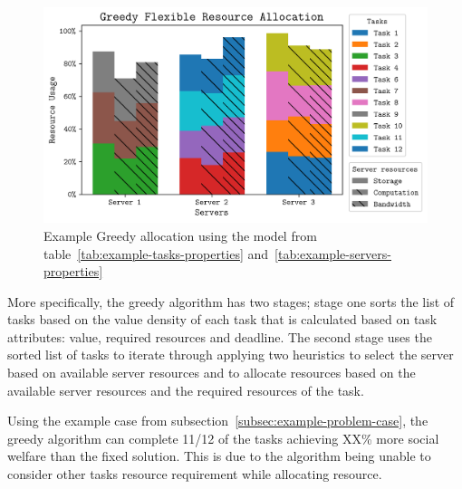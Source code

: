\begin{figure}
    \centering
    \includegraphics[width=\linewidth]{figs/allocation/greedy_flexible_resource_allocation.png}
    \caption{Example Greedy allocation using the model from table~\ref{tab:example-tasks-properties}
    and~\ref{tab:example-servers-properties}}
    \label{fig:example-greedy-allocation}
\end{figure}

More specifically, the greedy algorithm has two stages; stage one sorts the list of tasks based on the value
density of each task that is calculated based on task attributes: value, required resources and deadline. The second
stage uses the sorted list of tasks to iterate through applying two heuristics to select the server based on
available server resources and to allocate resources based on the available server resources and the required resources
of the task.

Using the example case from subsection~\ref{subsec:example-problem-case}, the greedy algorithm can complete 11/12 of
the tasks achieving XX\% more social welfare than the fixed solution. This is due to the algorithm being unable to %
consider other tasks resource requirement while allocating resource. %

